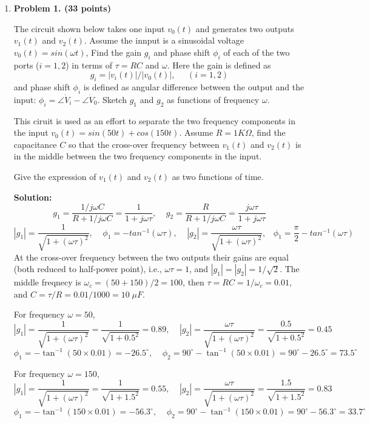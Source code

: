 \begin{enumerate}

\item {\bf Problem 1. (33 points)} 

The circuit shown below takes one input $v_0(t)$ and generates two outputs 
$v_1(t)$ and $v_2(t)$. Assume the innput is a sinusoidal voltage 
$v_0(t)=sin(\omega t)$, Find the gain $g_i$ and phase shift $\phi_i$ of 
each of the two ports ($i=1,2$) in terms of $\tau=RC$ and $\omega$. Here the 
gain is defined as 
\[ g_i=|v_i(t)|/|v_0(t)|,\;\;\;\;\;(i=1,2) \]
and phase shift $\phi_i$ is defined as angular difference between the output
and the input: $\phi_i=\angle \dot{V}_i-\angle \dot{V}_0$.
Sketch $g_1$ and $g_2$ as functions of frequency $\omega$.

This ciruit is used as an effort to separate the two frequency components 
in the input $v_0(t)=sin(50 t)+cos(150 t)$. Assume $R=1K\Omega$, find the 
capacitance $C$ so that the cross-over frequency between $v_1(t)$ and 
$v_2(t)$ is in the middle between the two frequency components in the input. 

Give the expression of $v_1(t)$ and $v_2(t)$ as two functions of time.


{\bf Solution:} 
\[	g_1=\frac{1/j\omega C}{R+1/j\omega C}=\frac{1}{1+j\omega \tau},\;\;\;\;
g_2=\frac{R}{R+1/j\omega C}=\frac{j\omega \tau}{1+j\omega \tau} \]
\[	|g_1|=\frac{1}{\sqrt{1+(\omega \tau)^2}},\;\;\;\;
	\phi_1=-tan^{-1}(\omega \tau),\;\;\;\;
	|g_2|=\frac{\omega \tau}{\sqrt{1+(\omega \tau)^2}},\;\;\;
	\phi_1=\frac{\pi}{2}-tan^{-1}(\omega \tau) \]
At the cross-over frequency between the two outputs their gains are equal 
(both reduced to half-power point), i.e., $\omega \tau=1$, and 
$|g_1|=|g_2|=1/\sqrt{2}$. The middle freqnecy is $\omega_c=(50+150)/2=100$,
then $\tau=RC=1/\omega_c=0.01$, and $C=\tau/R=0.01/1000=10\;\mu F$.

For frequency $\omega=50$, 
\[ |g_1|=\frac{1}{\sqrt{1+(\omega \tau)^2}}=\frac{1}{\sqrt{1+0.5^2}}=0.89,\;\;\;\;
|g_2|=\frac{\omega \tau}{\sqrt{1+(\omega \tau)^2}}=\frac{0.5}{\sqrt{1+0.5^2}}=0.45 \]
\[ \phi_1=-\tan^{-1}(50\times 0.01)=-26.5^\circ,\;\;\;\;
   \phi_2=90^\circ-\tan^{-1}(50\times 0.01)=90^\circ-26.5^\circ=73.5^\circ \]

For frequency $\omega=150$, 
\[ |g_1|=\frac{1}{\sqrt{1+(\omega \tau)^2}}=\frac{1}{\sqrt{1+1.5^2}}=0.55,\;\;\;\;
|g_2|=\frac{\omega \tau}{\sqrt{1+(\omega \tau)^2}}=\frac{1.5}{\sqrt{1+1.5^2}}=0.83 \]
\[ \phi_1=-\tan^{-1}(150\times 0.01)=-56.3^\circ,\;\;\;\;
   \phi_2=90^\circ-\tan^{-1}(150\times 0.01)=90^\circ-56.3^\circ=33.7^\circ \]


\end{enumerate}
